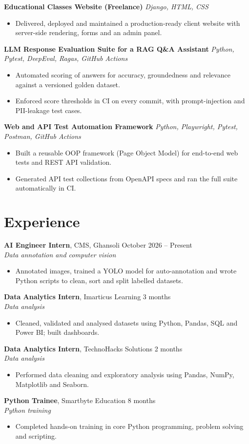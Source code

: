 \documentclass[9.5pt,a4paper]{article}
\newcommand{\entry}[4]{%
  \noindent\textbf{#1}, #2 \hfill {\small\color{gray}#3}\\
  \vspace{-1pt}\textit{#4}\\[-1pt]
}
\newcommand{\project}[2]{%
  \noindent\textbf{#1} \hfill {\small\textit{#2}}\\[-1pt]
}
\begin{document}
\project{Educational Classes Website (Freelance)}{Django, HTML, CSS}
\begin{itemize}
  \item Delivered, deployed and maintained a production-ready client website with server-side rendering, forms and an admin panel.
\end{itemize}

\project{LLM Response Evaluation Suite for a RAG Q\&A Assistant}{Python, Pytest, DeepEval, Ragas, GitHub Actions}
\begin{itemize}
  \item Automated scoring of answers for accuracy, groundedness and relevance against a versioned golden dataset.
  \item Enforced score thresholds in CI on every commit, with prompt-injection and PII-leakage test cases.
\end{itemize}

\project{Web and API Test Automation Framework}{Python, Playwright, Pytest, Postman, GitHub Actions}
\begin{itemize}
  \item Built a reusable OOP framework (Page Object Model) for end-to-end web tests and REST API validation.
  \item Generated API test collections from OpenAPI specs and ran the full suite automatically in CI.
\end{itemize}

\section*{Experience}
\entry{AI Engineer Intern}{CMS, Ghansoli}{October 2026 -- Present}{Data annotation and computer vision}
\begin{itemize}
  \item Annotated images, trained a YOLO model for auto-annotation and wrote Python scripts to clean, sort and split labelled datasets.
\end{itemize}
\entry{Data Analytics Intern}{Imarticus Learning}{3 months}{Data analysis}
\begin{itemize}
  \item Cleaned, validated and analysed datasets using Python, Pandas, SQL and Power BI; built dashboards.
\end{itemize}
\entry{Data Analytics Intern}{TechnoHacks Solutions}{2 months}{Data analysis}
\begin{itemize}
  \item Performed data cleaning and exploratory analysis using Pandas, NumPy, Matplotlib and Seaborn.
\end{itemize}
\entry{Python Trainee}{Smartbyte Education}{8 months}{Python training}
\begin{itemize}
  \item Completed hands-on training in core Python programming, problem solving and scripting.
\end{itemize}
\end{document}

